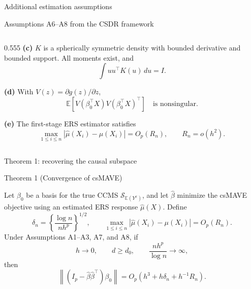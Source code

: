 \documentclass[
  ignorenonframetext,
  aspectratio=169,
  11pt]{beamer}
\begin{document}
\begin{frame}{Additional estimation assumptions}
\begin{block}{Assumptions A6--A8 from the CSDR framework}
\begin{minipage}[t][5.48cm][t]{\linewidth}
\begin{columns}[T,onlytextwidth]
\begin{column}{0.555\linewidth}
\vspace{0.07cm}
\textbf{(c)} \(K\) is a spherically symmetric density with bounded
derivative and bounded support. All moments exist, and
\[
\int uu^\top K(u)\,du=I .
\]

\vspace{0.05cm}
\textbf{(d)} With
\(
V(z)=\partial g(z)/\partial z
\),
\[
\mathbb E\!\left[
V(\beta_0^\top X)V(\beta_0^\top X)^\top
\right]
\quad\text{is nonsingular}.
\]

\vspace{0.05cm}
\textbf{(e)} The first-stage ERS estimator satisfies
\[
\max_{1\le i\le n}
\left|\widehat\mu(X_i)-\mu(X_i)\right|
=O_p(R_n),
\qquad R_n=o(h^2).
\]
\end{column}
\end{columns}
\end{minipage}
\end{block}
\end{frame}

\begin{frame}{Theorem 1: recovering the causal subspace}
\label{theorem-1-recovering-the-causal-subspace}
\vspace{-0.16cm}

\begin{block}{Theorem 1 (Convergence of csMAVE)}
\begin{minipage}[t][5.10cm][t]{\linewidth}
\small
\setlength{\abovedisplayskip}{4pt}
\setlength{\belowdisplayskip}{4pt}
\setlength{\abovedisplayshortskip}{3pt}
\setlength{\belowdisplayshortskip}{3pt}
Let \(\beta_0\) be a basis for the true CCMS
\(\mathcal S_{\mathbb E(Y^x)}\), and let \(\widehat\beta\) minimize the
csMAVE objective using an estimated ERS response \(\widehat\mu(X)\). Define
\[
\delta_n=
\left\{\frac{\log n}{n h^p}\right\}^{1/2},
\qquad
\max_{1\le i\le n}
\left|\widehat\mu(X_i)-\mu(X_i)\right|
=O_p(R_n).
\]
Under Assumptions A1--A3, A7, and A8, if
\[
h\to0,\qquad d\ge d_0,\qquad
\frac{nh^p}{\log n}\to\infty,
\]
then
\[
\boxed{\;
\left\|
(I_p-\widehat\beta\widehat\beta^\top)\beta_0
\right\|
=
O_p\!\left(h^3+h\delta_n+h^{-1}R_n\right).
\;}
\]
\end{minipage}
\end{block}
\end{frame}
\end{document}

